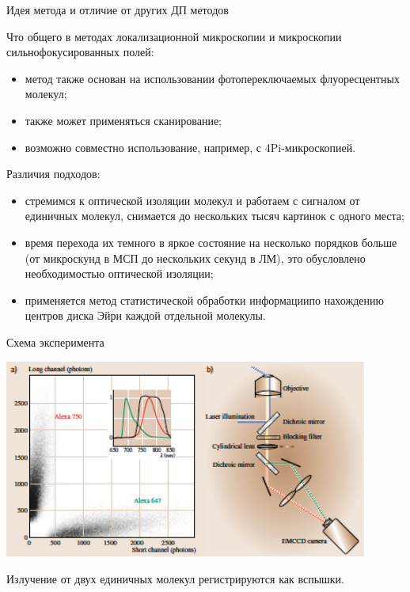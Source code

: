 \documentclass[9pt, compress, xcolor=table]{beamer}
\begin{document}
\begin{frame}{Идея метода и отличие от других ДП методов}

Что общего в методах локализационной микроскопии и микроскопии сильнофокусированных полей:
\begin{itemize}
\item  метод также основан на использовании фотопереключаемых флуоресцентных молекул;
\item также может применяться сканирование;
\item возможно совместно использование, например, с 4Pi-микроскопией.
\end{itemize}

Различия подходов:
\begin{itemize}
\item  стремимся к оптической изоляции молекул и работаем с сигналом от единичных молекул, снимается до нескольких тысяч картинок с одного места;
\item время перехода их темного в яркое состояние на несколько порядков больше  (от микроскунд в МСП до нескольких секунд в ЛМ), это обусловлено необходимостью оптической изоляции;
\item применяется метод статистической обработки информациипо нахождению центров диска Эйри каждой отдельной молекулы.
\end{itemize}

\end{frame}

\begin{frame}{Схема эксперимента}

\begin{center}
\includegraphics[width=0.9\textwidth]{lm21}
\end{center}

Излучение от двух единичных молекул регистрируются как вспышки.
\end{frame}
\end{document}
